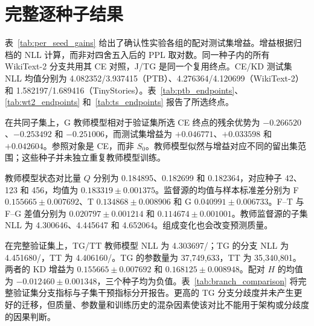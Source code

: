 \section{完整逐种子结果}\label{app:per-seed}



表~\ref{tab:per_seed_gains} 给出了确认性实验各组的配对测试集增益。增益根据归档的 NLL 计算，而非对四舍五入后的 PPL 取对数。同一种子内的所有 WikiText-2 分支共用其 CE 对照，J/TG 是同一个复用终点。CE/KD 测试集 NLL 均值分别为 4.082352/3.937415（PTB）、4.276364/4.120699（WikiText-2）和 1.582197/1.689416（TinyStories）。表~\ref{tab:ptb_endpoints}、\ref{tab:wt2_endpoints} 和~\ref{tab:ts_endpoints} 报告了所选终点。




在共同子集上，G 教师模型相对于验证集所选 CE 终点的残余优势为 $-0.266520$、$-0.253492$ 和 $-0.251006$，而测试集增益为 $+0.046771$、$+0.033598$ 和 $+0.042604$。参照对象是 CE，而非 $S_0$。教师模型似然与增益对应不同的留出集范围；这些种子并未独立重复教师模型训练。

教师模型状态对比量 $Q$ 分别为 0.184895、0.182699 和 0.182364，对应种子 42、123 和 456，均值为 $0.183319\pm0.001375$。监督源的均值与样本标准差分别为 F $0.155665\pm0.007692$、T $0.134868\pm0.008906$ 和 G $0.040991\pm0.006733$。F--T 与 F--G 差值分别为 $0.020797\pm0.001214$ 和 $0.114674\pm0.001001$。教师监督源的子集 NLL 为 4.300646、4.445647 和 4.652064。组成变化也会改变预测质量。

在完整验证集上，TG/TT 教师模型 NLL 为 4.303697/；TG 的分支 NLL 为 4.451680/，TT 为 4.406160/。TG 的参数量为 37,749,633，TT 为 35,340,801。两者的 KD 增益为 $0.155665\pm0.007692$ 和 $0.168125\pm0.008948$。配对 $H$ 的均值为 $-0.012460\pm0.001348$，三个种子均为负值。表~\ref{tab:branch_comparison} 将完整验证集分支指标与子集干预指标分开报告。更高的 TG 分支分歧度并未产生更好的迁移，但质量、参数量和训练历史的混杂因素使该对比不能用于架构或分歧度的因果判断。

